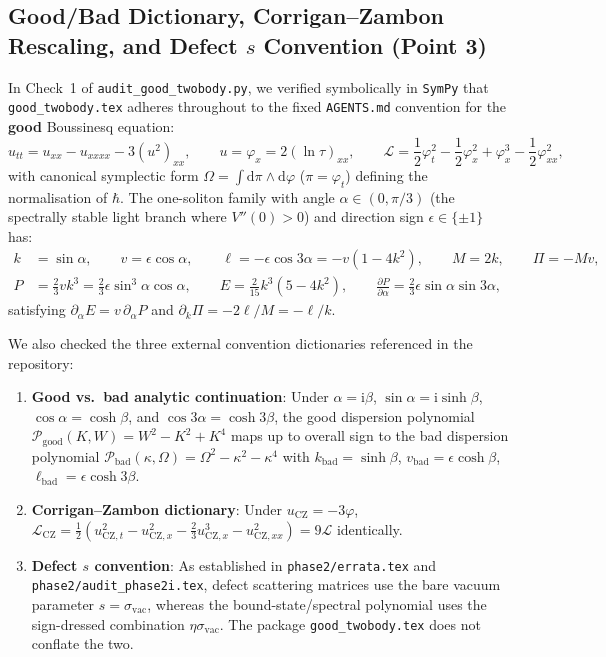 \documentclass[11pt,a4paper]{article}
\newcommand{\dd}{\mathrm{d}}
\newcommand{\ii}{\mathrm{i}}
\begin{document}
\subsection{Good/Bad Dictionary, Corrigan--Zambon Rescaling, and Defect $s$ Convention (Point 3)}

In Check~1 of \texttt{audit\_good\_twobody.py}, we verified symbolically in \texttt{SymPy} that \texttt{good\_twobody.tex} adheres throughout to the fixed \texttt{AGENTS.md} convention for the \textbf{good} Boussinesq equation:
\begin{equation}
u_{tt} = u_{xx} - u_{xxxx} - 3(u^2)_{xx}, \qquad u = \varphi_x = 2(\ln\tau)_{xx}, \qquad
\mathcal{L} = \frac{1}{2}\varphi_t^2 - \frac{1}{2}\varphi_x^2 + \varphi_x^3 - \frac{1}{2}\varphi_{xx}^2,
\end{equation}
with canonical symplectic form $\Omega = \int \dd\pi \wedge \dd\varphi$ ($\pi = \varphi_t$) defining the normalisation of $\hbar$. The one-soliton family with angle $\alpha \in (0,\pi/3)$ (the spectrally stable light branch where $V''(0) > 0$) and direction sign $\epsilon \in \{\pm 1\}$ has:
\begin{equation}
\begin{aligned}
k &= \sin\alpha, \qquad v = \epsilon\cos\alpha, \qquad \ell = -\epsilon\cos 3\alpha = -v(1 - 4k^2), \qquad M = 2k, \qquad \Pi = -Mv, \\
P &= \frac{2}{3}v k^3 = \frac{2}{3}\epsilon\sin^3\alpha\cos\alpha, \qquad E = \frac{2}{15}k^3(5 - 4k^2), \qquad
\frac{\partial P}{\partial\alpha} = \frac{2}{3}\epsilon\sin\alpha\sin 3\alpha,
\end{aligned}
\end{equation}
satisfying $\partial_\alpha E = v\,\partial_\alpha P$ and $\partial_k \Pi = -2\ell/M = -\ell/k$.

We also checked the three external convention dictionaries referenced in the repository:
\begin{enumerate}
\item \textbf{Good vs.\ bad analytic continuation}: Under $\alpha = \ii\beta$, $\sin\alpha = \ii\sinh\beta$, $\cos\alpha = \cosh\beta$, and $\cos 3\alpha = \cosh 3\beta$, the good dispersion polynomial $\mathcal{P}_{\mathrm{good}}(K,W) = W^2 - K^2 + K^4$ maps up to overall sign to the bad dispersion polynomial $\mathcal{P}_{\mathrm{bad}}(\kappa,\Omega) = \Omega^2 - \kappa^2 - \kappa^4$ with $k_{\mathrm{bad}}=\sinh\beta$, $v_{\mathrm{bad}}=\epsilon\cosh\beta$, $\ell_{\mathrm{bad}}=\epsilon\cosh 3\beta$.
\item \textbf{Corrigan--Zambon dictionary}: Under $u_{\mathrm{CZ}} = -3\varphi$, $\mathcal{L}_{\mathrm{CZ}} = \frac{1}{2}(u_{\mathrm{CZ},t}^2 - u_{\mathrm{CZ},x}^2 - \frac{2}{3}u_{\mathrm{CZ},x}^3 - u_{\mathrm{CZ},xx}^2) = 9\mathcal{L}$ identically.
\item \textbf{Defect $s$ convention}: As established in \texttt{phase2/errata.tex} and \texttt{phase2/audit\_phase2i.tex}, defect scattering matrices use the bare vacuum parameter $s = \sigma_{\mathrm{vac}}$, whereas the bound-state/spectral polynomial uses the sign-dressed combination $\eta\sigma_{\mathrm{vac}}$. The package \texttt{good\_twobody.tex} does not conflate the two.
\end{enumerate}
\end{document}

